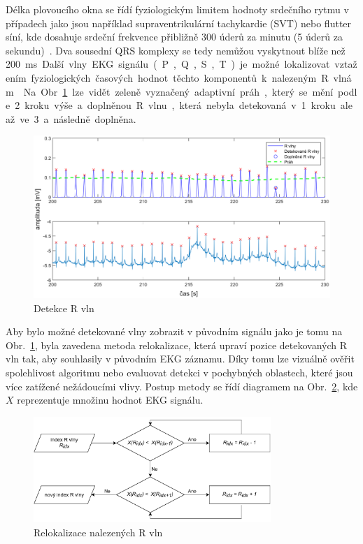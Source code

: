 Délka plovoucího okna se řídí fyziologickým limitem hodnoty srdečního rytmu v
případech jako jsou například supraventrikulární tachykardie (SVT) nebo flutter
síní, kde dosahuje srdeční frekvence přibližně 300 úderů za minutu (5 úderů za
sekundu)~\cite{Haberl2012,Goldberger2017}. Dva sousední QRS komplexy se tedy
nemůžou vyskytnout blíže než 200~\si\ms.

Další vlny EKG signálu (P, Q, S, T) je možné lokalizovat vztažením
fyziologických časových hodnot těchto komponentů k nalezeným R
vlnám~\cite{Nabian2018}. Na Obr.~\ref{fig:detection} lze vidět zeleně vyznačený
adaptivní práh, který se mění podle 2. kroku výše a doplněnou R vlnu, která
nebyla detekovaná v 1. kroku ale až ve 3. a následně doplněna.

\begin{figure}[h]
    \begin{center}
        \includegraphics[width=1\textwidth]{../assets/figures/detection}
        \caption{Detekce R vln}
        \label{fig:detection}
    \end{center}
\end{figure}

Aby bylo možné detekované vlny zobrazit v původním signálu jako je tomu na
Obr.~\ref{fig:detection}, byla zavedena metoda relokalizace, která upraví pozice
detekovaných R vln tak, aby souhlasily v původním EKG záznamu. Díky tomu lze
vizuálně ověřit spolehlivost algoritmu nebo evaluovat detekci v pochybných
oblastech, které jsou více zatížené nežádoucími vlivy. Postup metody se řídí
diagramem na Obr.~\ref{fig:fixpeaks}, kde $X$ reprezentuje množinu hodnot EKG
signálu.

\begin{figure}[h]
    \begin{center}
        \includegraphics[width=0.8\textwidth]{../assets/diagrams/fixpeaks}
        \caption{Relokalizace nalezených R vln}
        \label{fig:fixpeaks}
    \end{center}
\end{figure}

